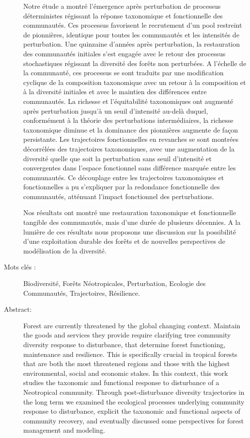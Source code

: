 \documentclass[
  11pt,
  french,
  A4paper,
  extrafontsizes,onecolumn,openright
  ]{memoir}
\begin{document}
\begin{normalsize}
\begin{description}
Notre étude a montré l'émergence après perturbation de processus
déterministes régissant la réponse taxonomique et fonctionnelle des
communautés. Ces processus favorisent le recrutement d'un pool restreint
de pionnières, identique pour toutes les communautés et les intensités
de perturbation. Une quinzaine d'années après perturbation, la
restauration des communautés initiales s'est engagée avec le retour des
processus stochastiques régissant la diversité des forêts non
perturbées. A l'échelle de la communauté, ces processus se sont traduits
par une modification cyclique de la composition taxonomique avec un
retour à la composition et à la diversité initiales et avec le maintien
des différences entre communautés. La richesse et l'équitabilité
taxonomiques ont augmenté après perturbation jusqu'à un seuil
d'intensité au-delà duquel, conformément à la théorie des perturbations
intermédiaires, la richesse taxonomique diminue et la dominance des
pionnières augmente de façon persistante. Les trajectoires
fonctionnelles en revanches se sont montrées décorrélées des
trajectoires taxonomiques, avec une augmentation de la diversité quelle
que soit la perturbation sans seuil d'intensité et convergentes dans
l'espace fonctionnel sans différence marquée entre les communautés. Ce
découplage entre les trajectoires taxonomiques et fonctionnelles a pu
s'expliquer par la redondance fonctionnelle des communautés, atténuant
l'impact fonctionnel des perturbations.

Nos résultats ont montré une restauration taxonomique et fonctionnelle
tangible des communautés, mais d'une durée de plusieurs décennies. A la
lumière de ces résultats nous proposons une discussion sur la
possibilité d'une exploitation durable des forêts et de nouvelles
perspectives de modélisation de la diversité.\newline

\item[Mots clés :]
Biodiversité, Forêts Néotropicales, Perturbation, Ecologie des Communautés, Trajectoires, Résilience.
~\\

\item[Abstract:]
Forest are currently threatened by the global changing context. Maintain
the goods and services they provide require clarifying tree community
diversity response to disturbance, that determine forest functioning,
maintenance and resilience. This is specifically crucial in tropical
forests that are both the most threatened regions and those with the
highest environmental, social and economic stakes. In this context, this
work studies the taxonomic and functional response to disturbance of a
Neotropical community. Through post-disturbance diversity trajectories
in the long term we examined the ecological processes underlying
community response to disturbance, explicit the taxonomic and functional
aspects of community recovery, and eventually discussed some
perspectives for forest management and modeling.\newline


\end{description}
\end{normalsize}
\end{document}
